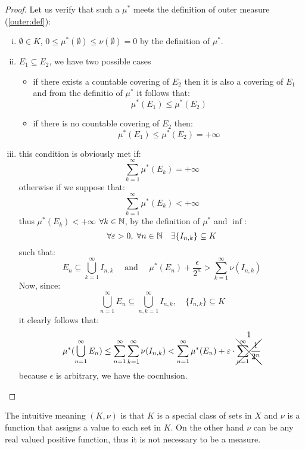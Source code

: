 \begin{proof}
    Let us verify that such a $\mu^*$ meets the definition of outer measure (\ref{outer:def}):
    \begin{enumerate}[i)]
        \item $\emptyset\in K$, $0\leq\mu^*(\emptyset)\leq\nu(\emptyset)=0$ by the definition of $\mu^*$.
        \item $E_1\subseteq E_2$, we have two possible cases
              \begin{itemize}
                  \item if there exists a countable covering of $E_2$ then it is also a covering of $E_1$ and from the definitio of $\mu^*$ it follows that:
                        \[
                            \mu^*(E_1) \leq \mu^*(E_2)
                        \]
                  \item if there is no countable covering of $E_2$ then:
                        \[
                            \mu^*(E_1) \leq \mu^*(E_2) = +\infty
                        \]
              \end{itemize}
        \item this condition is obviously met if:
              \[
                  \sum_{k=1}^{\infty} \mu^*(E_k) = +\infty
              \]
              otherwise if we suppose that:
              \[
                  \sum_{k=1}^{\infty} \mu^*(E_k) < +\infty
              \]
              thus $\mu^*(E_k)<+\infty$ $\forall k\in\mathbb{N}$, by the definition of $\mu^*$ and $\inf$:
              \[
                  \forall \varepsilon>0, \; \forall n\in\mathbb{N} \quad \exists \{ I_{n,k} \} \subseteq K
              \]
              such that:
              \[
                  E_n \subseteq \bigcup_{k=1}^{\infty} I_{n,k} \quad \text{ and } \quad \mu^*(E_n)+\frac{\epsilon}{2^n} > \sum_{k=1}^{\infty} \nu(I_{n,k})
              \]
              Now, since:
              \[
                  \bigcup_{n=1}^{\infty} E_n \subseteq \bigcup_{n,k=1}^{\infty} I_{n,k}, \quad \{ I_{n,k} \} \subseteq K
              \]
              it clearly follows that:
              \[
                  \mu^*(\bigcup_{n=1}^{\infty} E_n) \leq \sum_{n=1}^{\infty} \sum_{k=1}^{\infty} \nu(I_{n,k}) < \sum_{n=1}^{\infty}\mu^*(E_n) + \varepsilon\cdot\overset{\text{\normalsize1}}{\xcancel{\sum_{n=1}^{\infty} \frac{1}{2^n}}}
              \]
              because $\epsilon$ is arbitrary, we have the cocnlusion.
    \end{enumerate}
\end{proof}

The intuitive meaning $(K,\nu)$ is that $K$ is a special class of sets in $X$ and $\nu$ is a function that assigns a value to each set in $K$. On the other hand $\nu$ can be any real valued positive function, thus it is not necessary to be a measure.